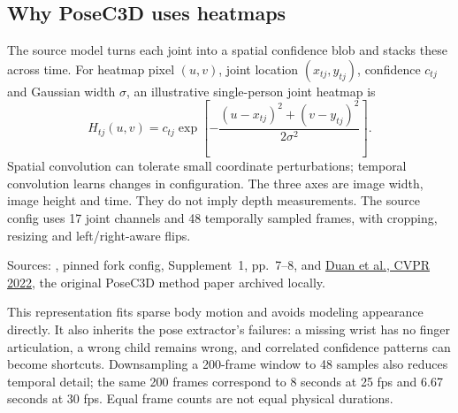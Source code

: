 \subsection{Why PoseC3D uses heatmaps}
The source model turns each joint into a spatial confidence blob and stacks these across time. For heatmap pixel $(u,v)$, joint location $(x_{tj},y_{tj})$, confidence $c_{tj}$ and Gaussian width $\sigma$, an illustrative single-person joint heatmap is
\[
H_{tj}(u,v)=c_{tj}\exp\!\left[-\frac{(u-x_{tj})^2+(v-y_{tj})^2}{2\sigma^2}\right].
\]
Spatial convolution can tolerate small coordinate perturbations; temporal convolution learns changes in configuration. The three axes are image width, image height and time. They do not imply depth measurements. The source config uses 17 joint channels and 48 temporally sampled frames, with cropping, resizing and left/right-aware flips.\par
Sources: , pinned fork config, Supplement~1, pp.~7--8, and \href{https://openaccess.thecvf.com/content/CVPR2022/html/Duan_Revisiting_Skeleton-Based_Action_Recognition_CVPR_2022_paper.html}{Duan et al., CVPR 2022}, the original PoseC3D method paper archived locally.

This representation fits sparse body motion and avoids modeling appearance directly. It also inherits the pose extractor's failures: a missing wrist has no finger articulation, a wrong child remains wrong, and correlated confidence patterns can become shortcuts. Downsampling a 200-frame window to 48 samples also reduces temporal detail; the same 200 frames correspond to 8 seconds at 25 fps and 6.67 seconds at 30 fps. Equal frame counts are not equal physical durations.

